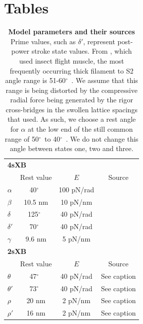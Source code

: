 \documentclass[11pt,titlepage]{article}
\newcommand{\de}{$^\circ$~} %
\begin{document}
\clearpage


\clearpage
\section*{Tables}
\begin{table}[ht]
    \begin{center}
    \begin{tabular}[t]{|l|ccc|} \hline
    \multicolumn{4}{|l|}{\textbf{4sXB}} \\ 
    \multicolumn{1}{|l}{~} 
              & Rest value & $E$        & Source \\ \cline{2-4}  
    $\alpha$  & 40\de      & 100 pN/rad & \citet{Liu2006}      \\
    $\beta$   & 10.5 nm    & 10 pN/nm   & \citet{Liu2006}      \\
    $\delta$  & 125\de     & 40 pN/rad  & \citet{Taylor1999}   \\
    $\delta'$ & 70\de      & 40 pN/rad  & \citet{Taylor1999}   \\
    $\gamma$  & 9.6 nm     & 5 pN/nm    & \citet{Houdusse2000} \\ \hline
    \multicolumn{4}{|l|}{\textbf{2sXB}} \\ 
    \multicolumn{1}{|l}{~} 
              & Rest value & $E$        & Source      \\ \cline{2-4} 
    $\theta$  & 47\de      & 40 pN/rad  & See caption \\
    $\theta'$ & 73\de      & 40 pN/rad  & See caption \\
    $\rho$    & 20 nm      & 2 pN/nm    & See caption \\
    $\rho'$   & 16 nm      & 2 pN/nm    & See caption \\ \hline
    \end{tabular}
    \caption{ 
	    \label{parameter_table}
	    \textbf{Model parameters and their sources} 
	    Prime values, such as $\delta'$, represent post-power stroke state values. 
	    From \citet{Liu2006}, which used insect flight muscle, the most frequently occurring thick filament to S2 angle range is 51-60\de. 
	    We assume that this range is being distorted by the compressive radial force being generated by the rigor cross-bridges in the swollen lattice spacings that \citet{Liu2006} used. 
	    As such, we choose a rest angle for $\alpha$ at the low end of the still common range of 50\de to 40\de. 
	    We do not change this angle between states one, two and three.
}
\end{center}
\end{table}
\end{document}

